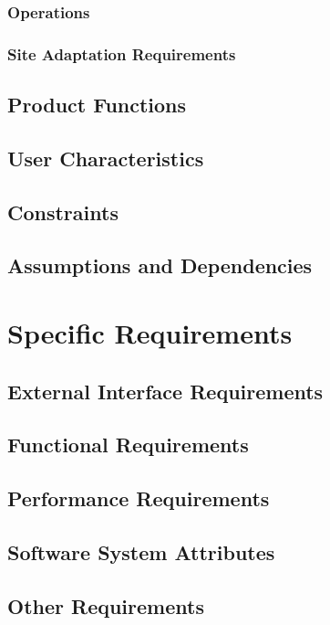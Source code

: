 \documentclass[10pt,a4paper]{article}
\begin{document}
			\subsubsection{Operations}
			
			\subsubsection{Site Adaptation Requirements}
		
		\subsection{Product Functions}
		
		\subsection{User Characteristics}
		
		\subsection{Constraints}
		
		\subsection{Assumptions and Dependencies}
	
			
	
	\section{Specific Requirements}
	
		\subsection{External Interface Requirements}
		
		\subsection{Functional Requirements}
		
		\subsection{Performance Requirements}
		
		\subsection{Software System Attributes}
		
		\subsection{Other Requirements}
\end{document}
